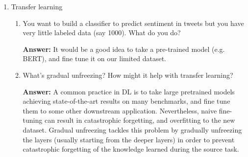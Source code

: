 \documentclass{article}
\newenvironment{QandA}{\begin{enumerate}[label=\arabic*.]}{\end{enumerate}}
\newenvironment{InnerQandA}{\begin{enumerate}[label=\roman*.]}{\end{enumerate}}
\newenvironment{answer}{\par\normalfont \textbf{Answer:}}{}
\begin{document}
\begin{QandA}
\begin{InnerQandA}
        \item How would changing the number of heads in multi-headed attention affect the model’s performance?
        \begin{answer}
            As we discussed in the previous question, it is of crucial importance to use more than one head, as it increases the expressivity of the Transformer. \\\\
            However, setting too many heads might cause duplication of information, overfitting, and entanglement of sentence structures.  \\\\
            Nevertheless, this is a hyperparameter that can be searched over -- the authors of the paper ``Attention is All You Need'' found that using 8 heads was optimal for the problem of machine translation. 
        \end{answer}
    \end{InnerQandA}

    \item Transfer learning
    \begin{InnerQandA}
        \item You want to build a classifier to predict sentiment in tweets but you have very little labeled data (say 1000). What do you do?
        \begin{answer}
            It would be a good idea to take a pre-trained model (e.g. BERT), and fine tune it on our limited dataset.
        \end{answer}

        \item What’s gradual unfreezing? How might it help with transfer learning?
        \begin{answer}
            A common practice in DL is to take large pretrained models achieving state-of-the-art results on many benchmarks, and fine tune them to some other downstream application. Nevertheless, naive fine-tuning can result in catastrophic forgetting, and overfitting to the new dataset. Gradual unfreezing tackles this problem by gradually unfreezing the layers (usually starting from the deeper layers) in order to prevent catastrophic forgetting of the knowledge learned during the source task.
        \end{answer}
    \end{InnerQandA}


\end{QandA}
\end{document}
